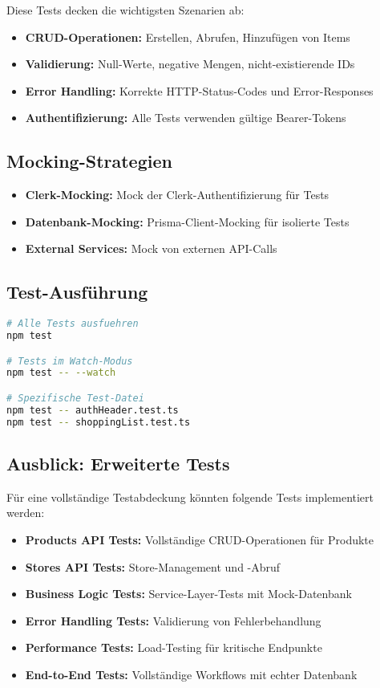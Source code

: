 Diese Tests decken die wichtigsten Szenarien ab:
\begin{itemize}
    \item \textbf{CRUD-Operationen:} Erstellen, Abrufen, Hinzufügen von Items
    \item \textbf{Validierung:} Null-Werte, negative Mengen, nicht-existierende IDs
    \item \textbf{Error Handling:} Korrekte HTTP-Status-Codes und Error-Responses
    \item \textbf{Authentifizierung:} Alle Tests verwenden gültige Bearer-Tokens
\end{itemize}

\subsection{Mocking-Strategien}

\begin{itemize}
    \item \textbf{Clerk-Mocking:} Mock der Clerk-Authentifizierung für Tests
    \item \textbf{Datenbank-Mocking:} Prisma-Client-Mocking für isolierte Tests
    \item \textbf{External Services:} Mock von externen API-Calls
\end{itemize}

\subsection{Test-Ausführung}

\begin{lstlisting}[language=bash,caption={Test-Befehle}]
# Alle Tests ausfuehren
npm test

# Tests im Watch-Modus
npm test -- --watch

# Spezifische Test-Datei
npm test -- authHeader.test.ts
npm test -- shoppingList.test.ts
\end{lstlisting}

\subsection{Ausblick: Erweiterte Tests}

Für eine vollständige Testabdeckung könnten folgende Tests implementiert werden:

\begin{itemize}
    \item \textbf{Products API Tests:} Vollständige CRUD-Operationen für Produkte
    \item \textbf{Stores API Tests:} Store-Management und -Abruf
    \item \textbf{Business Logic Tests:} Service-Layer-Tests mit Mock-Datenbank
    \item \textbf{Error Handling Tests:} Validierung von Fehlerbehandlung
    \item \textbf{Performance Tests:} Load-Testing für kritische Endpunkte
    \item \textbf{End-to-End Tests:} Vollständige Workflows mit echter Datenbank
\end{itemize}

